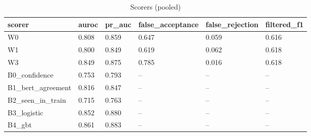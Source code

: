 \begin{table}[t]
\centering
\small
\begin{tabular}{llllll}
\hline
scorer & auroc & pr\_auc & false\_acceptance & false\_rejection & filtered\_f1 \\
\hline
W0 & 0.808 & 0.859 & 0.647 & 0.059 & 0.616 \\
W1 & 0.800 & 0.849 & 0.619 & 0.062 & 0.618 \\
W3 & 0.849 & 0.875 & 0.785 & 0.016 & 0.618 \\
B0\_confidence & 0.753 & 0.793 & -- & -- & -- \\
B1\_bert\_agreement & 0.816 & 0.847 & -- & -- & -- \\
B2\_seen\_in\_train & 0.715 & 0.763 & -- & -- & -- \\
B3\_logistic & 0.852 & 0.880 & -- & -- & -- \\
B4\_gbt & 0.861 & 0.883 & -- & -- & -- \\
\hline
\end{tabular}
\caption{Scorers (pooled)}
\label{tab:scorers_pooled}
\end{table}
